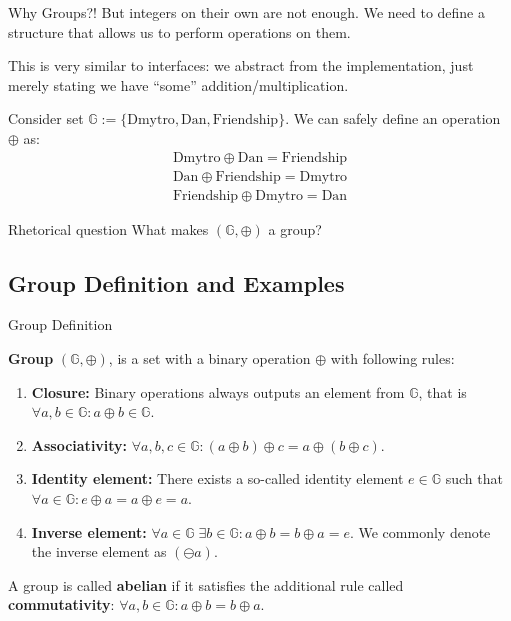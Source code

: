 \documentclass{beamer}
\begin{document}
    \begin{frame}{Why Groups?!}
        But integers on their own are not enough. We need to define a structure that allows us to perform operations on them.

        This is very similar to interfaces: we abstract from the implementation, just merely stating we have ``some'' addition/multiplication.

        \begin{example}
            Consider set $\mathbb{G} := \{\text{Dmytro}, \text{Dan}, \text{Friendship}\}$. We can safely define an operation $\oplus$ as:
            \begin{gather*}
                \text{Dmytro} \oplus \text{Dan} = \text{Friendship} \\ 
                \text{Dan} \oplus \text{Friendship} = \text{Dmytro} \\
                \text{Friendship} \oplus \text{Dmytro} = \text{Dan}
            \end{gather*}
        \end{example}

        \begin{block}{Rhetorical question}
            What makes $(\mathbb{G}, \oplus)$ a group?
        \end{block}
    \end{frame}
    \subsection{Group Definition and Examples}
    \begin{frame}{Group Definition}
      \begin{definition}
        \textbf{Group} $(\mathbb{G}, \oplus)$, is a set with a binary operation $\oplus$ with following rules:
        \begin{enumerate}
            \item \textbf{Closure:} Binary operations always outputs an element from $\mathbb{G}$, that is $\forall a,b \in \mathbb{G}: a \oplus b \in \mathbb{G}$.
            \item \textbf{Associativity:} $\forall a,b,c \in \mathbb{G}: (a \oplus b)\oplus c = a \oplus (b \oplus c)$.
            \item \textbf{Identity element:} There exists a so-called identity element $e \in \mathbb{G}$ such that $\forall a \in \mathbb{G}: e \oplus a = a \oplus e = a$.
            \item \textbf{Inverse element:} $\forall a \in \mathbb{G} \; \exists b \in \mathbb{G}: a\oplus b = b \oplus a = e$. We commonly denote the inverse element as $(\ominus a)$.
        \end{enumerate}
    \end{definition}

    \begin{definition}
        A group is called \textbf{abelian} if it satisfies the additional rule called \textbf{commutativity}: $\forall a,b \in \mathbb{G}: a \oplus b = b \oplus a$.
    \end{definition}
    \end{frame}
\end{document}
